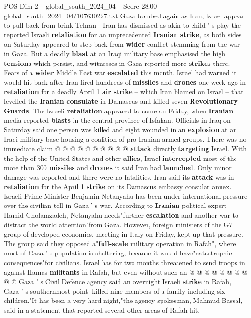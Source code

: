 \begin{textsample}{POS Dim 2 – global\_south\_2024\_04 – Score 28.00 – global\_south\_2024\_04/107630227.txt}  \label{ex:f2_pos_043}
Gaza bombed again as Iran, Israel appear to pull back from brink Tehran - Iran has dismissed as akin to child ' s play the reported Israeli \textbf{retaliation} for an unprecedented \textbf{Iranian} \textbf{strike}, as both sides on Saturday appeared to step back from \textbf{wider} conflict stemming from the war in Gaza.
But a deadly \textbf{blast} at an Iraqi military base emphasised the high \textbf{tensions} which persist, and witnesses in Gaza reported more \textbf{strikes} there.
Fears of a \textbf{wider} Middle East war \textbf{escalated} this month.
Israel had warned it would hit back after Iran fired hundreds of \textbf{missiles} and \textbf{drones} one week ago in \textbf{retaliation} for a deadly April 1 \textbf{air} \textbf{strike} -- which Iran blamed on Israel -- that levelled the \textbf{Iranian} \textbf{consulate} in Damascus and killed seven \textbf{Revolutionary} \textbf{Guards}.
The Israeli \textbf{retaliation} appeared to come on Friday, when \textbf{Iranian} media reported \textbf{blasts} in the central province of Isfahan.
Officials in Iraq on Saturday said one person was killed and eight wounded in an \textbf{explosion} at an Iraqi military base housing a coalition of pro-Iranian armed groups.
There was no immediate claim @ @ @ @ @ @ @ @ @ @ \textbf{attack} directly \textbf{targeting} Israel.
With the help of the United States and other \textbf{allies}, Israel \textbf{intercepted} most of the more than 300 \textbf{missiles} and \textbf{drones} it said Iran had \textbf{launched}.
Only minor damage was reported and there were no fatalities.
Iran said its \textbf{attack} was in \textbf{retaliation} for the April 1 \textbf{strike} on its Damascus embassy consular annex.
Israeli Prime Minister Benjamin Netanyahu has been under international pressure over the civilian toll in Gaza ' s war.
According to \textbf{Iranian} political expert Hamid Gholamzadeh, Netanyahu needs"further \textbf{escalation} and another war to distract the world attention"from Gaza.
However, foreign ministers of the G7 group of developed economies, meeting in Italy on Friday, kept up that pressure.
The group said they opposed a"\textbf{full-scale} military operation in Rafah", where most of Gaza ' s population is sheltering, because it would have"catastrophic consequences"for civilians.
Israel has for two months threatened to send troops in against Hamas \textbf{militants} in Rafah, but even without such an @ @ @ @ @ @ @ @ @ @ Gaza ' s Civil Defence agency said an overnight Israeli \textbf{strike} in Rafah, Gaza ' s southernmost point, killed nine members of a family including six children."It has been a very hard night,"the agency spokesman, Mahmud Bassal, said in a statement that reported several other areas of Rafah hit.

\end{textsample}
